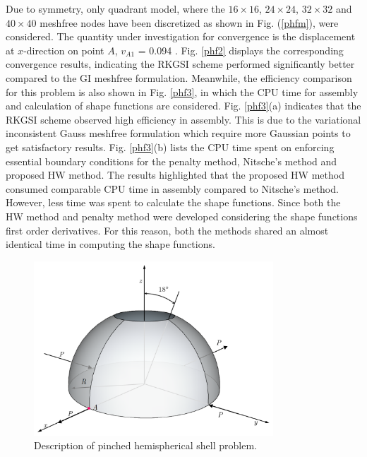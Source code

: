 Due to symmetry, only quadrant model, where the $16\times16$, $24\times24$, $32\times32$ and $40\times40$ meshfree nodes have been discretized as shown in Fig. (\ref{phfm}), were considered. The quantity under investigation for convergence is the displacement at $x$-direction on point $A$, $v_{A1}$ = 0.094 \cite{macneal1985}.
Fig. \ref{phf2} displays the corresponding convergence results, indicating the RKGSI scheme performed significantly better compared to the GI meshfree formulation. Meanwhile, the efficiency comparison for this problem is also shown in Fig. \ref{phf3}, in which the CPU time for assembly and calculation of shape functions are considered. Fig. \ref{phf3}(a) indicates that the RKGSI scheme observed high efficiency in assembly. This is due to the variational inconsistent Gauss meshfree formulation which require more Gaussian points to get satisfactory results. Fig. \ref{phf3}(b) lists the CPU time spent on enforcing essential boundary conditions for the penalty method, Nitsche's method and proposed HW method. The results highlighted that the proposed HW method consumed comparable CPU time in assembly compared to Nitsche's method. However, less time was spent to calculate the shape functions. Since both the HW method and penalty method were developed considering the shape functions first order derivatives. For this reason, both the methods shared an almost identical time in computing the shape functions.
\begin{figure}[!ht]
\centering
\includegraphics[width=0.8\textwidth]{figures/pfm}
\caption{Description of pinched hemispherical shell problem.}\label{phf1}
\end{figure}
